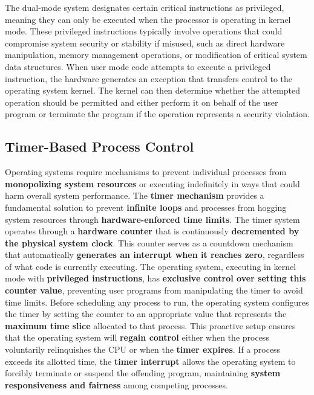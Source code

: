 The dual-mode system designates certain critical instructions as privileged, meaning they can only be executed when the processor is operating in kernel mode. These privileged instructions typically involve operations that could compromise system security or stability if misused, such as direct hardware manipulation, memory management operations, or modification of critical system data structures.
When user mode code attempts to execute a privileged instruction, the hardware generates an exception that transfers control to the operating system kernel. The kernel can then determine whether the attempted operation should be permitted and either perform it on behalf of the user program or terminate the program if the operation represents a security violation.



\subsection{Timer-Based Process Control}

Operating systems require mechanisms to prevent individual processes from \textbf{monopolizing system resources} or executing indefinitely in ways that could harm overall system performance. The \textbf{timer mechanism} provides a fundamental solution to prevent \textbf{infinite loops} and processes from hogging system resources through \textbf{hardware-enforced time limits}.
The timer system operates through a \textbf{hardware counter} that is continuously \textbf{decremented by the physical system clock}. This counter serves as a countdown mechanism that automatically \textbf{generates an interrupt when it reaches zero}, regardless of what code is currently executing. The operating system, executing in kernel mode with \textbf{privileged instructions}, has \textbf{exclusive control over setting this counter value}, preventing user programs from manipulating the timer to avoid time limits.
Before scheduling any process to run, the operating system configures the timer by setting the counter to an appropriate value that represents the \textbf{maximum time slice} allocated to that process. This proactive setup ensures that the operating system will \textbf{regain control} either when the process voluntarily relinquishes the CPU or when the \textbf{timer expires}. If a process exceeds its allotted time, the \textbf{timer interrupt} allows the operating system to forcibly terminate or suspend the offending program, maintaining \textbf{system responsiveness and fairness} among competing processes.


